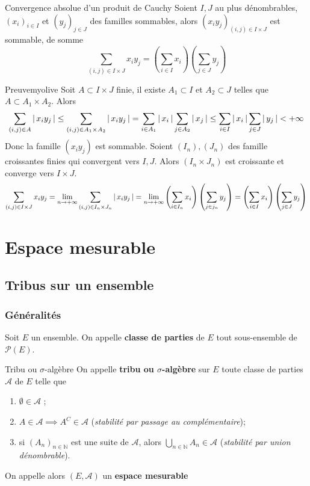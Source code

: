     \begin{prop}{Convergence absolue d’un produit de Cauchy}{}
        Soient $I,J$ au plus dénombrables, $(x_i)_{i \in I}$ et $(y_j)_{j \in J}$ des familles sommables, alors $(x_i y_j)_{(i,j) \in I \times J}$ est sommable, de somme 
        \[ \sum_{(i,j) \in I \times J} x_i y_j = \left(\sum_{i \in I} x_i\right)\left(\sum_{j \in J} y_j\right) \]      
    \end{prop}

    \begin{demo}{Preuve}{myolive}
        Soit $A \subset I \times J$ finie, il existe $A_1 \subset I$ et $A_2 \subset J$ telles que $A \subset A_1 \times A_2$. Alors 
        \[ \sum_{(i,j) \in A} \left\lvert \,x_i y_j \, \right\rvert \leq \sum_{(i,j) \in A_1 \times A_2} \left\lvert \,x_i y_j \, \right\rvert = \sum_{i \in A_1} \left\lvert \,x_i \, \right\rvert \sum_{j \in A_2} \left\lvert \,x_j \, \right\rvert \leq \sum_{i \in I} \left\lvert \,x_i \, \right\rvert \sum_{j \in J} \left\lvert \,y_j \, \right\rvert < +\infty \]  
        Donc la famille $(x_i y_j)$ est sommable. Soient $(I_n), (J_n)$ des famille croissantes finies qui convergent vers $I,J$. Alors $(I_n \times J_n)$ est croissante et converge vers $I \times J$. 
        \[ \sum_{(i,j) \in I \times J} x_i y_j = \lim_{n \to +\infty} \sum_{(i,j) \in I_n \times J_n} \left\lvert \,x_i y_j \, \right\rvert = \lim_{n \to +\infty} \left(\sum_{i \in I_n} x_i\right) \left(\sum_{j \in j_n} y_j \right) = \left(\sum_{i \in I} x_i\right) \left(\sum_{j \in J} y_j\right) \]
    \end{demo}

\section{Espace mesurable}

    \subsection{Tribus sur un ensemble}

    \subsubsection{Généralités}

    Soit $E$ un ensemble. On appelle \textbf{classe de parties} de $E$ tout sous-ensemble de $\mathcal{P}(E)$.

    \begin{defi}{Tribu ou $\sigma$-algèbre}{}
        On appelle \textbf{tribu ou $\sigma$-algèbre} sur $E$ toute classe de parties $\mathcal{A}$ de $E$ telle que 
        \begin{enumerate}
            \item $\emptyset \in \mathcal{A}$ ;
            \item $A \in \mathcal{A} \implies A^{C} \in \mathcal{A}$ (\textit{stabilité par passage au complémentaire});
            \item si $(A_n)_{n \in \mathbb{N}}$ est une suite de $\mathcal{A}$, alors $\bigcup_{n \in \mathbb{N}} A_n \in \mathcal{A}$ (\textit{stabilité par union dénombrable}).
        \end{enumerate}
        On appelle alors $(E,\mathcal{A})$ un \textbf{espace mesurable}
    \end{defi}


